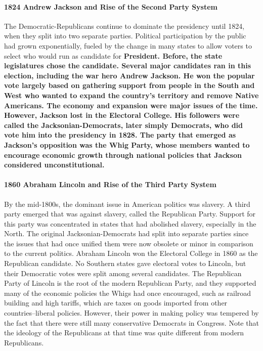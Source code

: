 \paragraph{1824 Andrew Jackson and Rise of the Second Party System} The
Democratic-Republicans continue to dominate the presidency until 1824, when they
split into two separate parties. Political participation by the public had grown
exponentially, fueled by the change in many states to allow voters to select who
would run as candidate for \bf{President}. Before, the state legislatures chose
the candidate. Several major candidates ran in this election, including the war
hero Andrew Jackson. He won the popular vote largely based on gathering support
from people in the South and West who wanted to expand the country's territory
and remove Native Americans. The economy and expansion were major issues of the
time. However, Jackson lost in the Electoral College. His followers were called
the Jacksonian-Democrats, later simply Democrats, who did vote him into the
presidency in 1828. The party that emerged as Jackson's opposition was the Whig
Party, whose members wanted to encourage economic growth through national
policies that Jackson considered unconstitutional.

\paragraph{1860 Abraham Lincoln and Rise of the Third Party System} By the
mid-1800s, the dominant issue in American politics was slavery. A third party
emerged that was against slavery, called the Republican Party. Support for this
party was concentrated in states that had abolished slavery, especially in the
North. The original Jacksonian-Democrats had split into separate parties since
the issues that had once unified them were now obsolete or minor in comparison
to the current politics. Abraham Lincoln won the Electoral College in 1860 as
the Republican candidate. No Southern states gave electoral votes to Lincoln,
but their Democratic votes were split among several candidates. The Republican
Party of Lincoln is the root of the modern Republican Party, and they supported
many of the economic policies the Whigs had once encouraged, such as railroad
building and high tariffs, which are taxes on goods imported from other
countries–liberal policies. However, their power in making policy was tempered
by the fact that there were still many conservative Democrats in Congress. Note
that the ideology of the Republicans at that time was quite different from
modern Republicans.

